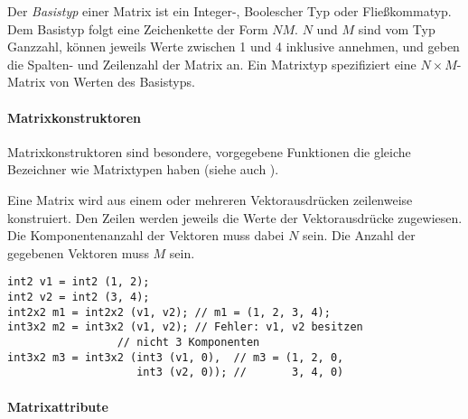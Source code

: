 Der \emph{Basistyp} einer Matrix ist ein Integer-, Boolescher Typ oder Fließkommatyp.
Dem Basistyp folgt eine Zeichenkette der Form $N$$M$. $N$ und
$M$ sind vom Typ Ganzzahl, können jeweils Werte zwischen 1 und 4 inklusive annehmen,
und geben die Spalten- und Zeilenzahl
der Matrix an. Ein Matrixtyp spezifiziert eine  $N \times M$-Matrix von Werten des Basistyps.

\paragraph{Matrixkonstruktoren}\label{Matrixkonstruktoren}

Matrixkonstruktoren sind besondere, vorgegebene Funktionen die gleiche Bezeichner wie Matrixtypen haben
(siehe auch ).


Eine Matrix wird aus einem oder mehreren Vektorausdrücken zeilenweise konstruiert. Den Zeilen werden
jeweils die Werte der Vektorausdrücke zugewiesen. Die Komponentenanzahl der Vektoren muss dabei
$N$ sein. Die Anzahl der gegebenen Vektoren muss $M$ sein.


\begin{lstlisting}
int2 v1 = int2 (1, 2);
int2 v2 = int2 (3, 4);
int2x2 m1 = int2x2 (v1, v2); // m1 = (1, 2, 3, 4);
int3x2 m2 = int3x2 (v1, v2); // Fehler: v1, v2 besitzen
			     // nicht 3 Komponenten
int3x2 m3 = int3x2 (int3 (v1, 0),  // m3 = (1, 2, 0,
                    int3 (v2, 0)); //       3, 4, 0)
\end{lstlisting}



\paragraph{Matrixattribute}\label{Matrixattribute}

